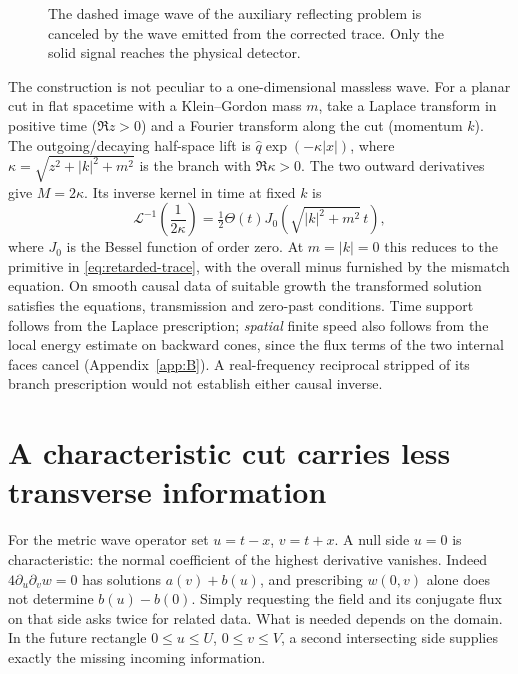 \begin{figure}[htb]\centering
{}
\caption{The dashed image wave of the auxiliary reflecting problem is canceled by the wave emitted from the corrected trace. Only the solid signal reaches the physical detector.}\end{figure}

The construction is not peculiar to a one-dimensional massless wave. For a planar cut in flat spacetime with a Klein--Gordon mass $m$, take a Laplace transform in positive time ($\Re z>0$) and a Fourier transform along the cut (momentum $k$). The outgoing/decaying half-space lift is $\widehat q\exp(-\kappa |x|)$, where $\kappa=\sqrt{z^2+|k|^2+m^2}$ is the branch with $\Re\kappa>0$. The two outward derivatives give $M=2\kappa$. Its inverse kernel in time at fixed $k$ is
\[
 \mathcal L^{-1}\!\left(\frac{1}{2\kappa}\right)
 =\tfrac12\Theta(t)J_0\!\left(\sqrt{|k|^2+m^2}\,t\right),
\]
where $J_0$ is the Bessel function of order zero. At $m=|k|=0$ this reduces to the primitive in \eqref{eq:retarded-trace}, with the overall minus furnished by the mismatch equation. On smooth causal data of suitable growth the transformed solution satisfies the equations, transmission and zero-past conditions. Time support follows from the Laplace prescription; \emph{spatial} finite speed also follows from the local energy estimate on backward cones, since the flux terms of the two internal faces cancel (Appendix~\ref{app:B}). A real-frequency reciprocal stripped of its branch prescription would not establish either causal inverse.

\section{A characteristic cut carries less transverse information}
For the metric wave operator set $u=t-x$, $v=t+x$. A null side $u=0$ is characteristic: the normal coefficient of the highest derivative vanishes. Indeed $4\partial_u\partial_v w=0$ has solutions $a(v)+b(u)$, and prescribing $w(0,v)$ alone does not determine $b(u)-b(0)$. Simply requesting the field and its conjugate flux on that side asks twice for related data. What is needed depends on the domain. In the future rectangle $0\le u\le U$, $0\le v\le V$, a second intersecting side supplies exactly the missing incoming information.

